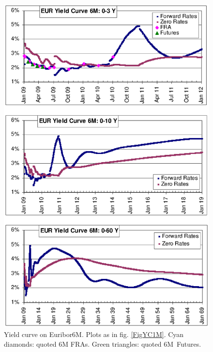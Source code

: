 \documentclass[11pt,reqno]{amsart}
\begin{document}
\begin{figure}[tbp]
\centering
\includegraphics[scale=0.9]{./FigYC6M}
\caption{Yield curve on Euribor6M. Plots as in fig. \protect\ref{FigYC1M}. Cyan diamonds: quoted 6M FRAs. Green triangles: quoted 6M\ Futures.}
\label{FigYC6M}
\end{figure}
\end{document}
